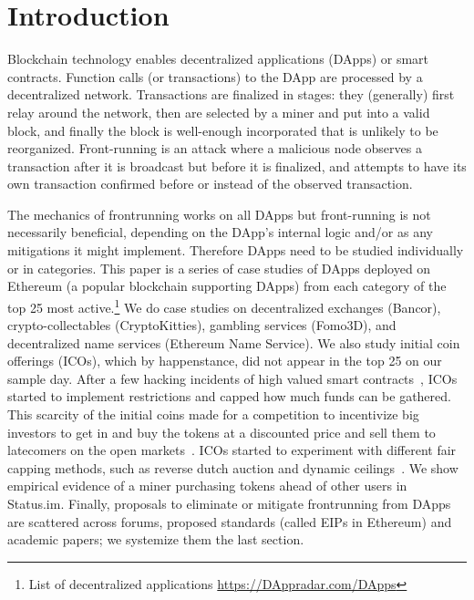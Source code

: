 
\section{Introduction} \label{sec:intro}

Blockchain technology enables decentralized applications (DApps) or smart contracts. Function calls (or transactions) to the DApp are processed by a decentralized network. Transactions are finalized in stages: they (generally) first relay around the network, then are selected by a miner and put into a valid block, and finally the block is well-enough incorporated that is unlikely to be reorganized. Front-running is an attack where a malicious node observes a transaction after it is broadcast but before it is finalized, and attempts to have its own transaction confirmed before or instead of the observed transaction. 

The mechanics of frontrunning works on all DApps but front-running is not necessarily beneficial, depending on the DApp's internal logic and/or  as any mitigations it might implement. Therefore DApps need to be studied individually or in categories. This paper is a series of case studies of DApps deployed on Ethereum (a popular blockchain supporting DApps) from each category of the top 25 most active.\footnote{List of decentralized applications \url{https://DAppradar.com/DApps}} We do case studies on decentralized exchanges (\eg Bancor), crypto-collectables (\eg CryptoKitties), gambling services (\eg Fomo3D), and decentralized name services (\eg Ethereum Name Service). We also study initial coin offerings (ICOs), which by happenstance, did not appear in the top 25 on our sample day. After a few hacking incidents of high valued smart contracts~\cite{siegel2016daohack}, ICOs started to implement restrictions and capped how much funds can be gathered. This scarcity of the initial coins made for a competition to incentivize big investors to get in and buy the tokens at a discounted price and sell them to latecomers on the open markets~\cite{zetzsche2018ico, li2018initial}. ICOs started to experiment with different fair capping methods, such as reverse dutch auction and dynamic ceilings~\cite{kaal2017initial}. We show empirical evidence of a miner purchasing tokens ahead of other users in Status.im. Finally, proposals to eliminate or mitigate frontrunning from DApps are scattered across forums, proposed standards (called EIPs in Ethereum) and academic papers; we systemize them the last section. 

